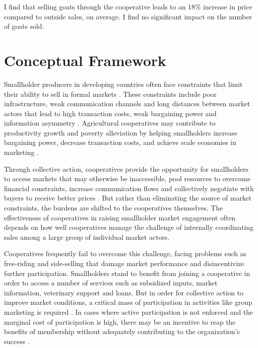 \documentclass[11pt]{article}
\begin{document}
I find that selling goats through the cooperative leads to an 18\% increase in price compared to outside sales, on average. I find no significant impact on the number of goats sold. 
 


\section{Conceptual Framework} \label{sec:background}

Smallholder producers in developing countries often face constraints that limit their ability to sell in formal markets \citep{barrett_smallholder_2008}. These constraints include poor infrastructure, weak communication channels and long distances between market actors that lead to high transaction costs, weak bargaining power and information asymmetry \citep{aker_information_2010,key_transactions_2000,staal_smallholder_1997}. Agricultural cooperatives may contribute to productivity growth and poverty alleviation by helping smallholders increase bargaining power, decrease transaction costs, and achieve scale economies in marketing \citep{markelova_collective_2010,staal_smallholder_1997,csaki_reaching_2003}. 

Through collective action, cooperatives provide the opportunity for smallholders to access markets that may otherwise be inaccessible, pool resources to overcome financial constraints, increase communication flows and collectively negotiate with buyers to receive better prices \citep{poole_review_2010}. But rather than eliminating the source of market constraints, the burdens are shifted to the cooperatives themselves. The effectiveness of cooperatives in raising smallholder market engagement often depends on how well cooperatives manage the challenge of internally coordinating sales among a large group of individual market actors.

Cooperatives frequently fail to overcome this challenge, facing problems such as free-riding and side-selling that damage market performance and disincentivize further participation. Smallholders stand to benefit from joining a cooperative in order to access a number of services \citep{fischer_smallholder_2014} such as subsidized inputs, market information, veterinary support and loans. But in order for collective action to improve market conditions, a critical mass of participation in activities like group marketing is required \citep{aflagah_cheap_2019}. In cases where active participation is not enforced and the marginal cost of participation is high, there may be an incentive to reap the benefits of membership without adequately contributing to the organization's success \citep{fischer_smallholder_2014}.
\end{document}
